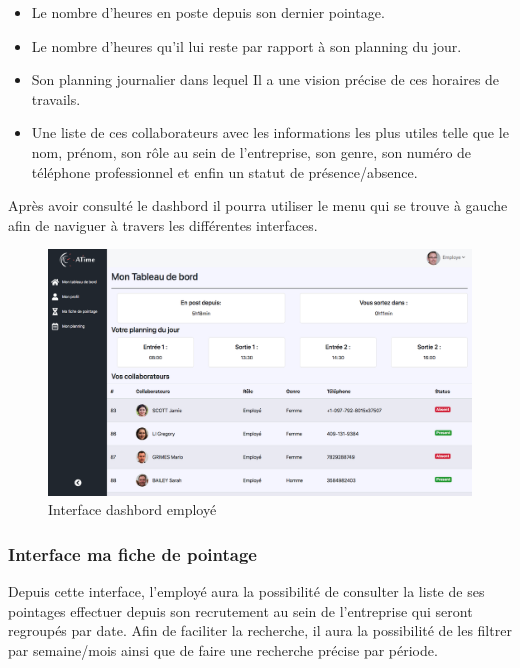                 \begin{itemize}
                    \item[\textbullet] Le nombre d’heures en poste depuis son dernier pointage.
                    \item[\textbullet] Le nombre d’heures qu’il lui reste par rapport à son planning du jour.
                    \item[\textbullet] Son planning journalier dans lequel Il a une vision précise de ces horaires de travails.
                    \item[\textbullet] Une liste de ces collaborateurs avec les informations les plus utiles telle que le nom, prénom, son rôle au sein de l’entreprise, son genre, son numéro de téléphone professionnel et enfin un statut de présence/absence.
                \end{itemize}
            Après avoir consulté le dashbord il pourra utiliser le menu qui se trouve à gauche afin de naviguer à travers les différentes interfaces.

                \begin{figure}[h!]
                             \centering
                                \includegraphics[scale=0.35 ]{images/interface/dashbord_employe.png}
                             \caption{Interface dashbord employé}
                             \label{fig92}
                \end{figure}

                
        \subsubsection*{Interface ma fiche de pointage}
            Depuis cette interface, l’employé aura la possibilité de consulter la liste de ses pointages effectuer depuis son recrutement au sein de l’entreprise qui seront regroupés par date. Afin de faciliter la recherche, il aura la possibilité de les filtrer par semaine/mois ainsi que de faire une recherche précise par période. 
            
